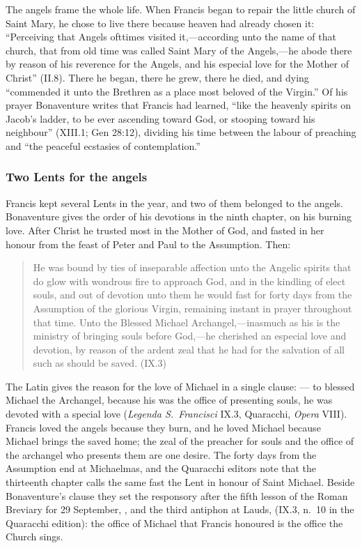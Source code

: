 The angels frame the whole life. When Francis began to repair the little
church of Saint Mary, he chose to live there because heaven had already
chosen it: ``Perceiving that Angels ofttimes visited it,---according unto the
name of that church, that from old time was called Saint Mary of the
Angels,---he abode there by reason of his reverence for the Angels, and his
especial love for the Mother of Christ'' (II.8). There he began, there he
grew, there he died, and dying ``commended it unto the Brethren as a place
most beloved of the Virgin.'' Of his prayer Bonaventure
writes that Francis had learned, ``like the heavenly spirits on Jacob's
ladder, to be ever ascending toward God, or stooping toward his neighbour''
(XIII.1; Gen 28:12), dividing his time between the labour of preaching and
``the peaceful ecstasies of contemplation.''

\subsubsection{Two Lents for the angels}

Francis kept several Lents in the year, and two of them belonged to the
angels. Bonaventure gives the order of his devotions in the ninth chapter,
on his burning love. After Christ he trusted most in the Mother of God, and
fasted in her honour from the feast of Peter and Paul to the Assumption.
Then:
\begin{quote}
He was bound by ties of inseparable affection unto the Angelic spirits that
do glow with wondrous fire to approach God, and in the kindling of elect
souls, and out of devotion unto them he would fast for forty days from the
Assumption of the glorious Virgin, remaining instant in prayer throughout
that time. Unto the Blessed Michael Archangel,---inasmuch as his is the
ministry of bringing souls before God,---he cherished an especial love and
devotion, by reason of the ardent zeal that he had for the salvation of all
such as should be saved. (IX.3)
\end{quote}
The Latin gives the reason for the love of Michael in a single clause:
 --- to blessed Michael the
Archangel, because his was the office of presenting souls, he was devoted
with a special love (\emph{Legenda S.\ Francisci} IX.3, Quaracchi,
\emph{Opera} VIII). Francis loved the angels because they burn, and he loved
Michael because Michael brings the saved home; the zeal of the preacher for
souls and the office of the archangel who presents them are one desire. The
forty days from the Assumption end at Michaelmas, and the Quaracchi editors
note that the thirteenth chapter calls the same fast the Lent in honour of
Saint Michael. Beside Bonaventure's clause they set the responsory after the
fifth lesson of the Roman Breviary for 29 September, , and the third antiphon at Lauds,
 (IX.3, n.~10 in the Quaracchi edition): the office of Michael
that Francis honoured is the office the Church sings.

